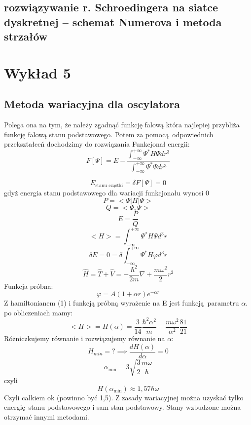 \documentclass{article}
\begin{document}
		\subsection{rozwiązywanie r. Schroedingera na siatce dyskretnej – schemat Numerova i metoda strzałów}
		
	\section{Wykład 5}
		\subsection{Metoda wariacyjna dla oscylatora}
        Polega ona na tym, że należy zgadnąć funkcję falową która najlepiej przybliża funkcję falową stanu podstawowego. Potem za pomocą odpowiednich przekształceń dochodzimy do rozwiązania 
        Funkcjonał energii:
		    $$F[\Psi] = E - \frac{\int_{-\infty}^{+\infty}\Psi^*H\Psi dr^3}{\int_{-\infty}^{+\infty}\Psi^*\Psi dr^3}$$	
		    
		    $$E_{\text{stanu cząstki}} = \delta F[\Psi] = 0 $$ gdyż energia stanu podstawowego dla wariacji funkcjonału wynosi 0
		    $$P = <\Psi | H | \Psi >$$
		    $$Q = <\Psi, \Psi>$$
		    $$E = \frac{P}{Q}$$
		    $$<H> = \int_{-\infty}^{+\infty} \Psi^* H \Psi d^3 r$$
		    $$\delta E = 0 = \delta\int_{-\infty}^{+\infty} \Psi ^* H \varphi d^3r$$
			$$\hat{H} = \hat{T} + \hat{V} = -\frac{\hbar^2}{2m}\nabla + \frac{m\omega^2}{2}r^2$$
			Funkcja próbna:
			$$\varphi = A(1 + \alpha r)e^{-\alpha r}$$
			Z hamiltonianem (1) i funkcją próbną wyrażenie na E jest funkcją parametru $\alpha$. po obliczeniach mamy:
			$$<H> = H(\alpha) = \frac{3}{14} \frac{\hbar ^2 \alpha ^2}{m} + \frac{m \omega^2  }{\alpha^2}\frac{81}{21}$$
			Różniczkujemy równanie i rozwiązujemy równanie na $\alpha$:
			$$H_{min} = ? \implies \frac{dH(\alpha)}{d\alpha} = 0$$
			$$\alpha_{\min} = 3 \sqrt{\frac{3}{2}}\frac{m\omega}{\hbar}$$
			czyli
			$$H(\alpha_{\min})\approx1,57 \hbar \omega$$
			Czyli całkiem ok (powinno być 1,5). Z zasady wariacyjnej można uzyskać tylko energię stanu podstawowego i sam stan podstawowy. Stany wzbudzone można otrzymać innymi metodami.
\end{document}
